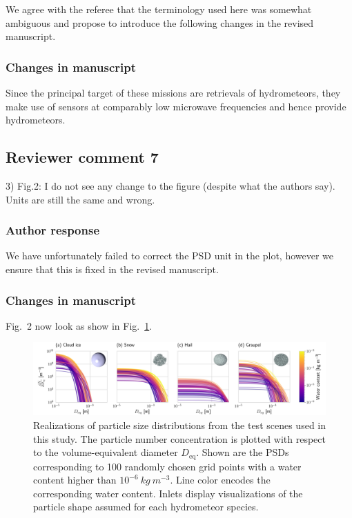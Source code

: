 \begin{description}
We agree with the referee that the terminology used here was somewhat ambiguous
and propose to introduce the following changes in the revised manuscript.

\subsubsection*{Changes in manuscript}

  \begin{change}[53]
Since the principal target of these missions are retrievals of \DIFdelbegin
{}\DIFdelend \DIFaddbegin {}\DIFaddend
hydrometeors, they make use of sensors at comparably low microwave frequencies
and hence provide \DIFdelbegin {}\DIFdelend \DIFaddbegin {}\DIFaddend hydrometeors.
    \end{change}

\subsection*{Reviewer comment 7}

 3) Fig.2: I do not see any change to the figure (despite what the authors say).
 Units are still the same and wrong.

\subsubsection*{Author response}

We have unfortunately failed to correct the PSD unit in the plot, however we ensure
that this is fixed in the revised manuscript.

\subsubsection*{Changes in manuscript}

Fig.~2 now look as show in Fig.~\ref{fig:gem_psds}.


\begin{figure}[h!]
\centering \includegraphics[width = \textwidth]{../plots/gem_psds.png}
\caption{Realizations of particle size distributions from the test scenes used
  in this study. The particle number concentration is plotted with respect to
  the volume-equivalent diameter $D_\text{eq}$. Shown are the PSDs corresponding
  to 100 randomly chosen grid points with a water content higher than
  $10^{-6}\ \unit{kg\ m^{-3}}$. Line color encodes the corresponding water
  content. Inlets display visualizations of the particle shape assumed for each
  hydrometeor species.}
\label{fig:gem_psds}
\end{figure}


\end{description}
